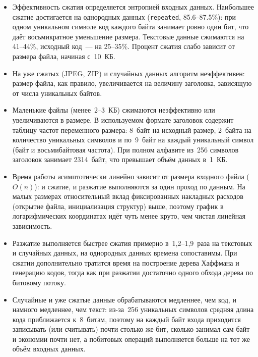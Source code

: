 \documentclass[a4paper]{article}
\begin{document}
\begin{itemize}
    \item Эффективность сжатия определяется энтропией входных данных.
    Наибольшее сжатие достигается на однородных данных
    (\texttt{repeated}, 85.6--87.5\%): при одном уникальном символе
    код каждого байта занимает ровно один бит, что даёт восьмикратное
    уменьшение размера. Текстовые данные сжимаются на 41--44\%,
    исходный код~--- на 25--35\%. Процент сжатия слабо зависит
    от размера файла, начиная с~10~КБ.

    \item На уже сжатых (JPEG, ZIP) и случайных данных алгоритм
    неэффективен: размер файла, как правило, увеличивается на величину заголовка,
    зависящую от числа уникальных байтов.

    \item Маленькие файлы (менее~2--3~КБ) сжимаются неэффективно
    или увеличиваются в размере. В используемом формате заголовок
    содержит таблицу частот переменного размера: 8~байт на исходный
    размер, 2~байта на количество уникальных символов и по~9~байт
    на каждый уникальный символ (байт и восьмибайтовая частота).
    При полном алфавите из~256 символов заголовок занимает
    2314~байт, что превышает объём данных в~1~КБ.

    \item Время работы асимптотически линейно зависит от размера
    входного файла ($O(n)$): и сжатие, и разжатие выполняются за
    один проход по данным. На малых размерах относительный вклад
    фиксированных накладных расходов (открытие файла, инициализация
    структур) выше, поэтому график в логарифмических координатах
    идёт чуть менее круто, чем чистая линейная зависимость.

    \item Разжатие выполняется быстрее сжатия примерно в~1,2--1,9~раза на текстовых
    и случайных данных, на однородных данных времена сопоставимы.
    При сжатии дополнительно тратится время на построение дерева
    Хаффмана и генерацию кодов, тогда как при разжатии достаточно
    одного обхода дерева по битовому потоку.
    
    \item Случайные и уже сжатые данные обрабатываются медленнее,
    чем код, и намного медленнее, чем текст: из-за~256 уникальных
    символов средняя длина кода приближается к~8~битам, поэтому
    на каждый байт входа приходится записывать (или считывать)
    почти столько же бит, сколько занимал сам байт и экономии
    почти нет, а побитовых операций выполняется больше на тот же
    объём входных данных.
\end{itemize}
\end{document}
